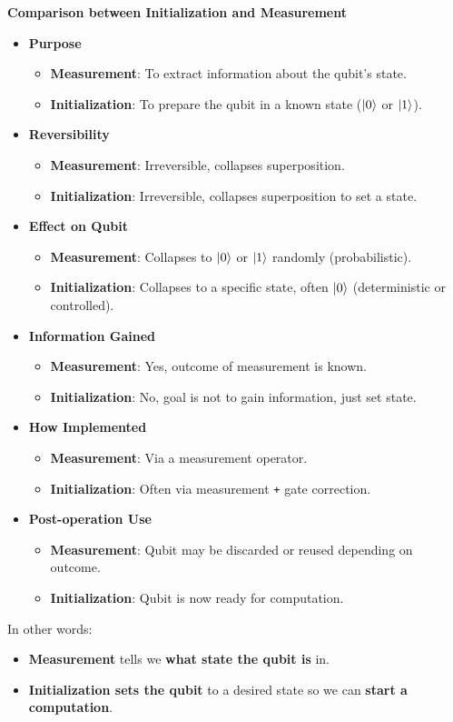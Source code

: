 \highspace
\begin{flushleft}
    \textcolor{Green3}{ \textbf{Comparison between Initialization and Measurement}}
\end{flushleft}
\begin{itemize}
    \item \textcolor{Green3}{\textbf{Purpose}}
    \begin{itemize}
        \item \textbf{Measurement}: To extract information about the qubit's state.
        \item \textbf{Initialization}: To prepare the qubit in a known state ($| 0 \rangle$ or $| 1 \rangle$).
    \end{itemize}
    \item \textcolor{Green3}{\textbf{Reversibility}}
    \begin{itemize}
        \item \textbf{Measurement}: Irreversible, collapses superposition.
        \item \textbf{Initialization}: Irreversible, collapses superposition to set a state.
    \end{itemize}
    \item \textcolor{Green3}{\textbf{Effect on Qubit}}
    \begin{itemize}
        \item \textbf{Measurement}: Collapses to $| 0 \rangle$ or $| 1 \rangle$ randomly (probabilistic).
        \item \textbf{Initialization}: Collapses to a specific state, often $| 0 \rangle$ (deterministic or controlled).
    \end{itemize}
    \item \textcolor{Green3}{\textbf{Information Gained}}
    \begin{itemize}
        \item \textbf{Measurement}: Yes, outcome of measurement is known.
        \item \textbf{Initialization}: No, goal is not to gain information, just set state.
    \end{itemize}
    \item \textcolor{Green3}{\textbf{How Implemented}}
    \begin{itemize}
        \item \textbf{Measurement}: Via a measurement operator.
        \item \textbf{Initialization}: Often via measurement \texttt{+} gate correction.
    \end{itemize}

    \newpage

    \item \textcolor{Green3}{\textbf{Post-operation Use}}
    \begin{itemize}
        \item \textbf{Measurement}: Qubit may be discarded or reused depending on outcome.
        \item \textbf{Initialization}: Qubit is now ready for computation.
    \end{itemize}
\end{itemize}
In other words:
\begin{itemize}
    \item \textbf{Measurement} tells we \textbf{what state the qubit is} in.
    \item \textbf{Initialization sets the qubit} to a desired state so we can \textbf{start a computation}.
\end{itemize}